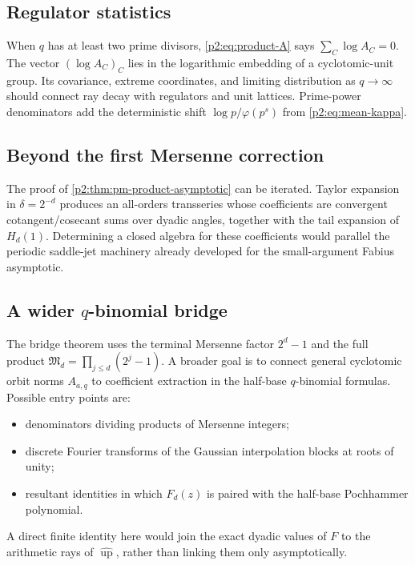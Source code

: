 \documentclass[11pt,oneside]{article}
\theoremstyle{definition}
\theoremstyle{remark}
\newcommand{\Up}{\operatorname{up}}
\begin{document}
\subsection{Regulator statistics}

When $q$ has at least two prime divisors, \eqref{p2:eq:product-A} says
$\sum_C\log A_C=0$. The vector $(\log A_C)_C$ lies in the logarithmic embedding of
a cyclotomic-unit group. Its covariance, extreme coordinates, and limiting
distribution as $q\to\infty$ should connect ray decay with regulators and unit
lattices. Prime-power denominators add the deterministic shift
$\log p/\varphi(p^s)$ from \eqref{p2:eq:mean-kappa}.

\subsection{Beyond the first Mersenne correction}

The proof of \cref{p2:thm:pm-product-asymptotic} can be iterated. Taylor expansion in
$\delta=2^{-d}$ produces an all-orders transseries whose coefficients are convergent
cotangent/cosecant sums over dyadic angles, together with the tail expansion of
$H_d(1)$. Determining a closed algebra for these coefficients would parallel the
periodic saddle-jet machinery already developed for the small-argument Fabius
asymptotic.

\subsection{A wider $q$-binomial bridge}

The bridge theorem uses the terminal Mersenne factor $2^d-1$ and the full product
$\mathfrak M_d=\prod_{j\le d}(2^j-1)$. A broader goal is to connect general
cyclotomic orbit norms $A_{a,q}$ to coefficient extraction in the half-base
$q$-binomial formulas. Possible entry points are:
\begin{itemize}
 \item denominators dividing products of Mersenne integers;
 \item discrete Fourier transforms of the Gaussian interpolation blocks at roots
 of unity;
 \item resultant identities in which $F_d(z)$ is paired with the half-base
 Pochhammer polynomial.
\end{itemize}
A direct finite identity here would join the exact dyadic values of $F$ to the
arithmetic rays of $\widehat{\Up}$, rather than linking them only asymptotically.
\end{document}
